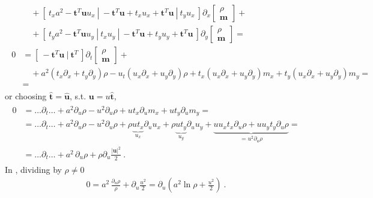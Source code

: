\documentclass[letterpaper,10pt,english]{jupyterBook}
\begin{document}
\begin{equation*}
\begin{split}
\begin{aligned}
& \quad  + [ \ t_x a^2 - \mathbf{t}^T \mathbf{u} u_x \ | \ - \mathbf{t}^T \mathbf{u} + t_x u_x + \mathbf{t}^T \mathbf{u} \ | \ t_y u_x \ ] \partial_x \begin{bmatrix} \rho \\ \mathbf{m} \end{bmatrix} + \\
& \quad  + [ \ t_y a^2 - \mathbf{t}^T \mathbf{u} u_y \ | \ t_x u_y \ | \ - \mathbf{t}^T \mathbf{u} + t_y u_y + \mathbf{t}^T \mathbf{u} \ ] \partial_y \begin{bmatrix} \rho \\ \mathbf{m} \end{bmatrix} = \\
0
& = [ \ - \mathbf{t}^T \mathbf{u} \ | \ \mathbf{t}^T \ ] \partial_t \begin{bmatrix} \rho \\ \mathbf{m} \end{bmatrix} + \\
& \quad +  a^2 \left( t_x \partial_x + t_y \partial_y \right) \rho - u_t \left( u_x \partial_x + u_y \partial_y \right) \rho + t_x \left( u_x \partial_x + u_y \partial_y \right) m_x + t_y \left( u_x \partial_x + u_y \partial_y \right) m_y = \\
& = 
\end{aligned}\end{split}
\end{equation*}
\sphinxAtStartPar
or choosing \(\hat{\mathbf{t}} = \hat{\mathbf{u}}\), s.t. \(\mathbf{u} = u \hat{\mathbf{t}}\),
\begin{equation*}
\begin{split}\begin{aligned}
0 
& = \dots \partial_t \dots + a^2 \partial_u \rho - u^2 \partial_u \rho + u t_x \partial_u m_x + u t_y \partial_u m_y = \\
& = \dots \partial_t \dots + a^2 \partial_u \rho - u^2 \partial_u \rho + \rho \underbrace{u t_x}_{u_x} \partial_u u_x + \rho \underbrace{u t_y}_{u_y} \partial_u u_y + \underbrace{ u u_x t_x \partial_u \rho + u u_y t_y \partial_u \rho}_{ = u^2 \partial_u \rho} = \\
& = \dots \partial_t \dots + a^2 \, \partial_u \rho + \rho \partial_u \frac{|\mathbf{u}|^2}{2} \ .
\end{aligned}\end{split}
\end{equation*}
\sphinxAtStartPar
In , dividing by \(\rho \ne 0\)
\begin{equation*}
\begin{split}0 = a^2 \, \frac{\partial_u \rho}{\rho} + \partial_u \frac{u^2}{2} = \partial_u \left( a^2 \ln \rho + \frac{u^2}{2} \right) \ .\end{split}
\end{equation*}
\end{document}
